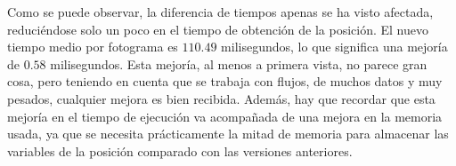{\begin{table}[h]
	\centering
	\caption{Tabla con los tiempos de la ejecución con la versión reducida de la posición.}
	\label{tab:tiempos2}
\end{table}

Como se puede observar, la diferencia de tiempos apenas se ha visto afectada, reduciéndose solo un poco en el tiempo de obtención de la posición. El nuevo tiempo medio por fotograma es $110.49$ milisegundos, lo que significa una mejoría de $0.58$ milisegundos. Esta mejoría, al menos a primera vista, no parece gran cosa, pero teniendo en cuenta que se trabaja con flujos, de muchos datos y muy pesados, cualquier mejora es bien recibida. Además, hay que recordar que esta mejoría en el tiempo de ejecución va acompañada de una mejora en la memoria usada, ya que se necesita prácticamente la mitad de memoria para almacenar las variables de la posición comparado con las versiones anteriores. 

}
